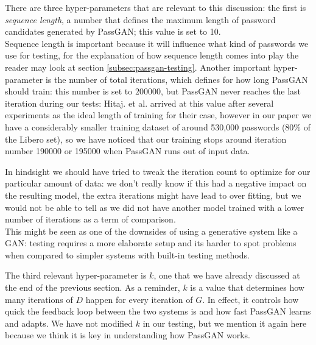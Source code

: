 There are three hyper-parameters that are relevant to this discussion: the first is \emph{sequence length}, a number that defines the maximum length of password candidates generated by PassGAN; this value is set to 10.\\ 
Sequence length is important because it will influence what kind of passwords we use for testing, for the explanation of how sequence length comes into play the reader may look at section \ref{subsec:passgan-testing}.
Another important hyper-parameter is the number of total iterations, which defines for how long PassGAN should train: this number is set to $200000$, but PassGAN never reaches the last iteration during our tests: Hitaj. et al. arrived at this value after several experiments as the ideal length of training for their case, however in our paper we have a considerably smaller training dataset of around 530,000 passwords (80\% of the Libero set), so we have noticed that our training stops around iteration number 190000 or 195000 when PassGAN runs out of input data.

In hindsight we should have tried to tweak the iteration count to optimize for our particular amount of data: we don't really know if this had a negative impact on the resulting model, the extra iterations might have lead to over fitting, but we would not be able to tell as we did not have another model trained with a lower number of iterations as a term of comparison.\\
This might be seen as one of the downsides of using a generative system like a GAN: testing requires a more elaborate setup and its harder to spot problems when compared to simpler systems with built-in testing methods. 

The third relevant hyper-parameter is $k$, one that we have already discussed at the end of the previous section. As a reminder, $k$ is a value that determines how many iterations of $D$ happen for every iteration of $G$. In effect, it controls how quick the feedback loop between the two systems is and how fast PassGAN learns and adapts. We have not modified $k$ in our testing, but we mention it again here because we think it is key in understanding how PassGAN works. 
